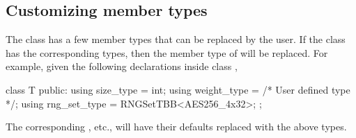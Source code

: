 \subsection{Customizing member types}
\label{sub:Customizing member types}

The  class has a few member types that can be replaced
by the user. If the class  has the corresponding types, then the
member type of  will be replaced. For example, given the
following declarations inside class ,
\begin{cppcode}
  class T
  {
      public:
      using size_type = int;
      using weight_type = /* User defined type */;
      using rng_set_type = RNGSetTBB<AES256_4x32>;
  };
\end{cppcode}
The corresponding , etc., will have their
defaults replaced with the above types.

